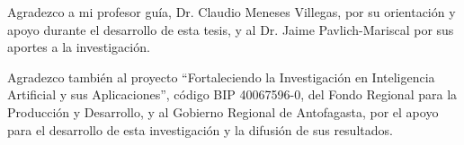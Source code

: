 \fontsize{12pt}{14}\selectfont %

Agradezco a mi profesor guía, Dr. Claudio Meneses Villegas, por su orientación y apoyo durante el desarrollo de esta tesis, y al Dr. Jaime Pavlich-Mariscal por sus aportes a la investigación.

Agradezco también al proyecto ``Fortaleciendo la Investigación en Inteligencia Artificial y sus Aplicaciones'', código BIP 40067596-0, del Fondo Regional para la Producción y Desarrollo, y al Gobierno Regional de Antofagasta, por el apoyo para el desarrollo de esta investigación y la difusión de sus resultados.
